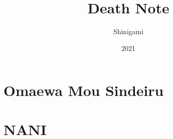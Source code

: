 \documentclass{Report}
\title{Death Note}
\author{Shinigami}
\date{2021}
\begin{document}
\maketitle
\section*{Omaewa Mou Sindeiru}
\section*{NANI}
\end{document}
